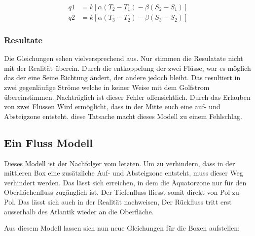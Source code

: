 \begin{equation}
\begin{aligned}
 q1 &= k[\alpha(T_2-T_1)-\beta(S_2-S_1)] 
 \\
 q2 &= k[\alpha(T_3-T_2)-\beta(S_3-S_2)]
\end{aligned}
\end{equation}


\subsubsection{Resultate}


Die Gleichungen sehen vielversprechend aus. Nur stimmen die Resulatate nicht mit der Realität überein.
Durch die entkoppelung der zwei Flüsse, war es möglich das der eine Seine Richtung ändert, der andere jedoch bleibt. Das resultiert in zwei gegenläufige Ströme welche in keiner Weise mit dem Golfstrom übereinstimmen.
Nachträglich ist dieser Fehler offensichtlich. Durch das Erlauben von zwei Flüssen Wird ermöglicht, dass in der Mitte euch eine auf- und Absteigzone entsteht.
diese Tatsache macht dieses Modell zu einem Fehlschlag.

\subsection{Ein Fluss Modell} 

Dieses Modell ist der Nachfolger vom letzten. 
Um zu verhindern, dass in der mittleren Box eine zusätzliche Auf- und Absteigzone entsteht, muss dieser Weg verhindert werden. Das lässt sich erreichen, in dem die Äquatorzone nur für den Oberflächenfluss zugänglich ist. Der Tiefenfluss fliesst somit direkt von Pol zu Pol. 
Das lässt sich auch in der Realität nachweisen, Der Rückfluss tritt erst ausserhalb des Atlantik wieder an die Oberfläche.


Aus diesem Modell lassen sich nun neue Gleichungen für die Boxen aufstellen:

